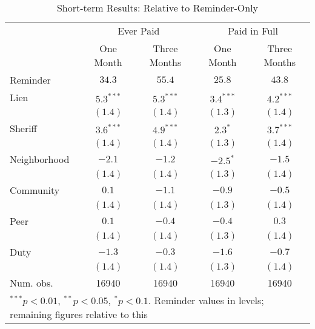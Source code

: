 \documentclass[12pt]{article}
\begin{document}
\begin{table}[htb]
\caption{Short-term Results: Relative to Reminder-Only}
\begin{center}
\begin{tabular}{l c c c c }
\hline
 & \multicolumn{2}{c}{Ever Paid} & \multicolumn{2}{c}{Paid in Full} \\
 & One Month & Three Months & One Month & Three Months \\
Reminder     & $34.3$ & $55.4$ & $25.8$ & $43.8$ \\
\hline
Lien         & $5.3^{***}$  & $5.3^{***}$  & $3.4^{***}$  & $4.2^{***}$  \\
             & $(1.4)$      & $(1.4)$      & $(1.3)$      & $(1.4)$      \\
Sheriff      & $3.6^{***}$  & $4.9^{***}$  & $2.3^{*}$    & $3.7^{***}$  \\
             & $(1.4)$      & $(1.4)$      & $(1.3)$      & $(1.4)$      \\
Neighborhood & $-2.1$       & $-1.2$       & $-2.5^{*}$   & $-1.5$       \\
             & $(1.4)$      & $(1.4)$      & $(1.3)$      & $(1.4)$      \\
Community    & $0.1$        & $-1.1$       & $-0.9$       & $-0.5$       \\
             & $(1.4)$      & $(1.4)$      & $(1.3)$      & $(1.4)$      \\
Peer         & $0.1$        & $-0.4$       & $-0.4$       & $0.3$        \\
             & $(1.4)$      & $(1.4)$      & $(1.3)$      & $(1.4)$      \\
Duty         & $-1.3$       & $-0.3$       & $-1.6$       & $-0.7$       \\
             & $(1.4)$      & $(1.4)$      & $(1.3)$      & $(1.4)$      \\
\hline
Num. obs.    & 16940        & 16940        & 16940        & 16940        \\
\hline
\multicolumn{5}{l}{\scriptsize{$^{***}p<0.01$, $^{**}p<0.05$, $^*p<0.1$. Reminder values in levels; remaining figures relative to this}}
\end{tabular}
\label{sh_lpm_rob}
\end{center}
\end{table}
\end{document}
